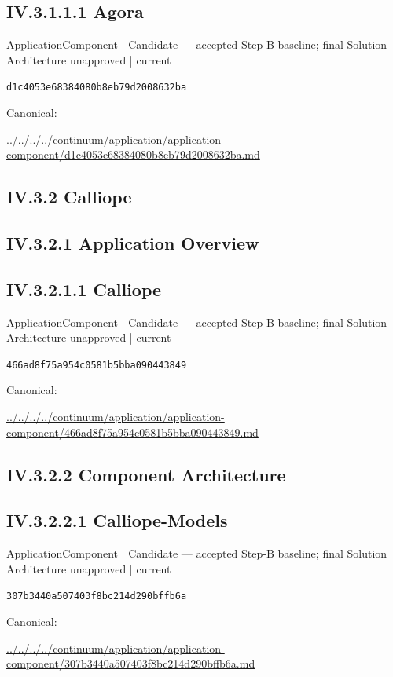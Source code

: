 \documentclass[10pt,a4paper]{article}
\begin{document}
\subsection*{IV.3.1.1.1 Agora}
{\small ApplicationComponent | Candidate — accepted Step-B baseline; final Solution Architecture unapproved | current}\par
\texttt{d1c4053e68384080b8eb79d2008632ba}\par
Canonical: \par
{\footnotesize\url{../../../../continuum/application/application-component/d1c4053e68384080b8eb79d2008632ba.md}}\par
\subsection*{IV.3.2 Calliope}
\subsection*{IV.3.2.1 Application Overview}
\subsection*{IV.3.2.1.1 Calliope}
{\small ApplicationComponent | Candidate — accepted Step-B baseline; final Solution Architecture unapproved | current}\par
\texttt{466ad8f75a954c0581b5bba090443849}\par
Canonical: \par
{\footnotesize\url{../../../../continuum/application/application-component/466ad8f75a954c0581b5bba090443849.md}}\par
\subsection*{IV.3.2.2 Component Architecture}
\subsection*{IV.3.2.2.1 Calliope-Models}
{\small ApplicationComponent | Candidate — accepted Step-B baseline; final Solution Architecture unapproved | current}\par
\texttt{307b3440a507403f8bc214d290bffb6a}\par
Canonical: \par
{\footnotesize\url{../../../../continuum/application/application-component/307b3440a507403f8bc214d290bffb6a.md}}\par
\end{document}
